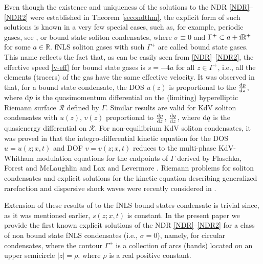 \documentclass[pdftex]{sigma}
\numberwithin{equation}{section}
\newcommand{\G}{\Gamma}
\def\Rscr{\mathcal{R}}
\def\R{{\mathbb R}}
\def\s{ {\sigma}}
\def\s{\sigma}
\def\G{\Gamma}
\begin{document}
Even though the existence and uniqueness of the solutions to the NDR \eqref{NDR}--\eqref{NDR2} were established in Theorem \ref{secondthm}, the explicit form of such solutions is known in a very few special cases, such as, for example, periodic gases, see \cite{TW}, or bound state soliton condensates, where $\s\equiv 0$ and $\G^+\subset a+{\rm i}\R^+$ for some $a\in\R$. fNLS soliton gases with such $\G^+$ are called bound state gases. This name reflects the fact that, as can be easily seen from \eqref{NDR}--\eqref{NDR2}, the effective speed
\eqref{v-eff}
for bound state gases is $s=-4 a$ for all $z\in\G^+$, i.e., all the elements (tracers) of the gas have the same effective velocity. It was observed in \cite{KT2021} that, for a bound state condensate, the DOS $u(z)$ is proportional to the $\frac{{\rm d}p}{{\rm d}z}$, where ${\rm d}p$ is the quasimomentum differential on the (limiting) hyperelliptic Riemann surface $\Rscr$ defined by $\G$. Similar results are valid for KdV soliton condensates with $u(z)$, $v(z)$ proportional to $\frac{{\rm d}p}{{\rm d}z}$, $\frac{{\rm d}q}{{\rm d}z}$, where ${\rm d}q$ is the quasienergy differential on $\Rscr$. For non-equilibrium KdV soliton condensates, it was proved in \cite{CERT} that the integro-differential kinetic equation for
the DOS $u=u(z;x,t)$ and DOF $v=v(z;x,t)$
reduces to the multi-phase KdV-Whitham modulation equations for the endpoints of $\G$ derived by
Flaschka, Forest and McLaughlin \cite{FFM} and Lax and Levermore \cite{LL83}.
Riemann problems for soliton condensates and explicit solutions for
the kinetic equation describing generalized rarefaction and dispersive shock waves were recently considered in \cite{CERT}.

Extension of these results of \cite{CERT} to the fNLS bound states condensate is trivial since, as it was mentioned earlier, $s(z;x,t)$ is constant. In the
present paper we provide the first known explicit solutions of the NDR \eqref{NDR}--\eqref{NDR2} for a
class of
non bound state fNLS condensates (i.e., $\s=0$), namely, for circular condensates, where the contour $\G^+$ is a collection of arcs (bands) located on an upper semicircle $|z|=\rho$, where $\rho$ is a real positive constant.
\end{document}
